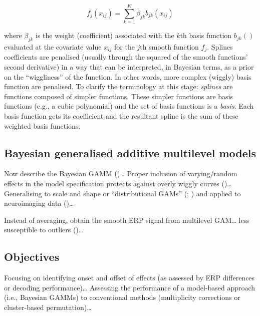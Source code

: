 \documentclass[
  doc,
  floatsintext,
  longtable,
  a4paper,
  nolmodern,
  notxfonts,
  notimes,
  colorlinks=true,linkcolor=blue,citecolor=blue,urlcolor=blue]{apa7}
\begin{document}
\[
f_{j}\left(x_{i j}\right) = \sum_{k=1}^K \beta_{jk} b_{jk}\left(x_{ij}\right)
\]

where \(\beta_{jk}\) is the weight (coefficient) associated with the
\(k\)th basis function \(b_{jk}()\) evaluated at the covariate value
\(x_{ij}\) for the \(j\)th smooth function \(f_{j}\). Splines
coefficients are penalised (usually through the squared of the smooth
functions' second derivative) in a way that can be interpreted, in
Bayesian terms, as a prior on the ``wiggliness'' of the function. In
other words, more complex (wiggly) basis function are penalised. To
clarify the terminology at this stage: \emph{splines} are functions
composed of simpler functions. These simpler functions are basis
functions (e.g., a cubic polynomial) and the set of basis functions is a
\emph{basis}. Each basis function gets its coefficient and the resultant
spline is the sum of these weighted basis functions.

\subsection{Bayesian generalised additive multilevel
models}\label{bayesian-generalised-additive-multilevel-models}

Now describe the Bayesian GAMM ()\ldots{} Proper inclusion of varying/random effects in the model
specification protects against overly wiggly curves
()\ldots{} Generalising
to scale and shape or ``distributional GAMs''
(;
) and applied to
neuroimaging data ()\ldots{}

Instead of averaging, obtain the smooth ERP signal from multilevel
GAM\ldots{} less susceptible to outliers
()\ldots{}

\subsection{Objectives}\label{objectives}

Focusing on identifying onset and offset of effects (as assessed by ERP
differences or decoding performance)\ldots{} Assessing the performance
of a model-based approach (i.e., Bayesian GAMMs) to conventional methods
(multiplicity corrections or cluster-based permutation)\ldots{}
\end{document}
